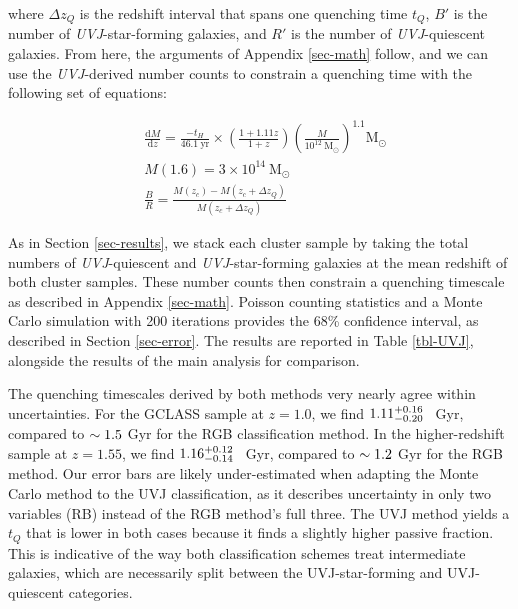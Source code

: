 where $\Delta z_Q$ is the redshift interval that spans one quenching time $t_Q$, $B'$ is the number of \textit{UVJ}-star-forming galaxies, and $R'$ is the number of \textit{UVJ}-quiescent galaxies.
From here, the arguments of Appendix \ref{sec-math} follow, and we can use the \textit{UVJ}-derived number counts to constrain a quenching time with the following set of equations:

\begin{align*}
&\frac{\mathrm{d}M}{\mathrm{d}z} = \frac{-t_H}{46.1\ \mathrm{yr}} \times \left(\frac{1+1.11z}{1+z}\right)\left(\frac{M}{10^{12}\ \mathrm{M_\odot}}\right)^{1.1} \mathrm{M_\odot}\\
&M(1.6) = 3\times10^{14}\ \mathrm{M_\odot}\\
&\frac{B}{R} = \frac{M(z_c) - M(z_c + \Delta z_Q)}{M(z_c + \Delta z_Q)}
\end{align*}

As in Section \ref{sec-results}, we stack each cluster sample by taking the total numbers of \textit{UVJ}-quiescent and \textit{UVJ}-star-forming galaxies at the mean redshift of both cluster samples.
These number counts then constrain a quenching timescale as described in Appendix \ref{sec-math}.
Poisson counting statistics and a Monte Carlo simulation with 200 iterations provides the 68\% confidence interval, as described in Section \ref{sec-error}.
The results are reported in Table \ref{tbl-UVJ}, alongside the results of the main analysis for comparison.

The quenching timescales derived by both methods very nearly agree within uncertainties.
For the GCLASS sample at $z=1.0$, we find $1.11\substack{+0.16 \\ -0.20}$~ Gyr, compared to $\sim1.5$ Gyr for the RGB classification method.
In the higher-redshift sample at $z=1.55$, we find $1.16\substack{+0.12 \\ -0.14}$~ Gyr, compared to $\sim1.2$ Gyr for the RGB method.
Our error bars are likely under-estimated when adapting the Monte Carlo method to the UVJ classification, as it describes uncertainty in only two variables (RB) instead of the RGB method's full three.
The UVJ method yields a $t_Q$ that is lower in both cases because it finds a slightly higher passive fraction.
This is indicative of the way both classification schemes treat intermediate galaxies, which are necessarily split between the UVJ-star-forming and UVJ-quiescent categories.



